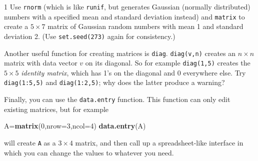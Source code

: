 \documentclass[11pt,]{article}
\newenvironment{Shaded}{\begin{snugshade}}{\end{snugshade}}
\newcommand{\DataTypeTok}[1]{\textcolor[rgb]{0.13,0.29,0.53}{#1}}
\newcommand{\DecValTok}[1]{\textcolor[rgb]{0.00,0.00,0.81}{#1}}
\newcommand{\KeywordTok}[1]{\textcolor[rgb]{0.13,0.29,0.53}{\textbf{#1}}}
\newcommand{\NormalTok}[1]{#1}
\let\BeginKnitrBlock\begin \let\EndKnitrBlock\end
\begin{document}
\BeginKnitrBlock{exercisebox}{1}
Use \texttt{rnorm} (which is like \texttt{runif}, but generates Gaussian (normally distributed) numbers with a specified mean and standard deviation instead) and \texttt{matrix} to create a \(5 \times 7\) matrix of Gaussian random numbers with mean 1 and standard deviation 2. (Use \texttt{set.seed(273)} again for consistency.)
\EndKnitrBlock{exercisebox}

Another useful function for creating matrices is \texttt{diag}. \texttt{diag(v,n)} creates an \(n \times n\) matrix with data
vector \(v\) on its diagonal. So for example \texttt{diag(1,5)} creates the \(5 \times 5\) \emph{identity matrix}, which has 1's on the diagonal and 0 everywhere else. Try \texttt{diag(1:5,5)} and \texttt{diag(1:2,5)}; why does the latter produce a warning?

Finally, you can use the \texttt{data.entry} function. This function can only edit existing matrices, but for example

\begin{Shaded}
\begin{Highlighting}[]
\NormalTok{A=}\KeywordTok{matrix}\NormalTok{(}\DecValTok{0}\NormalTok{,}\DataTypeTok{nrow=}\DecValTok{3}\NormalTok{,}\DataTypeTok{ncol=}\DecValTok{4}\NormalTok{)}
\KeywordTok{data.entry}\NormalTok{(A)}
\end{Highlighting}
\end{Shaded}

will create \texttt{A} as a \(3 \times 4\) matrix, and then call up a spreadsheet-like interface in which you can change the values to whatever you need.
\end{document}
